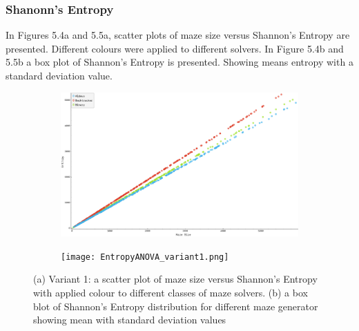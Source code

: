  \subsubsection{Shanonn's Entropy}
In Figures 5.4a and 5.5a, scatter plots of maze size versus Shannon's Entropy are presented. Different colours were applied to different solvers. In Figure 5.4b
and 5.5b a box plot of Shannon's Entropy is presented. Showing means entropy with a standard deviation value.
    \begin{figure}[!h]
        \centering
        \begin{subfigure}[!h]{0.4\textwidth}
           \includegraphics[scale = 0.15]{EntropyVsSize_variant1.png}
           \caption{}
        \end{subfigure}
        \begin{subfigure}[!h]{0.6\textwidth}
           \texttt{[image: EntropyANOVA\_variant1.png]}
           \caption{}
        \end{subfigure}
        \caption{(a) Variant 1: a scatter plot of maze size versus Shannon's Entropy with applied colour to different classes of maze solvers.
        (b) a box blot of Shannon's Entropy distribution for different maze generator showing mean with standard deviation values}
        \end{figure}

